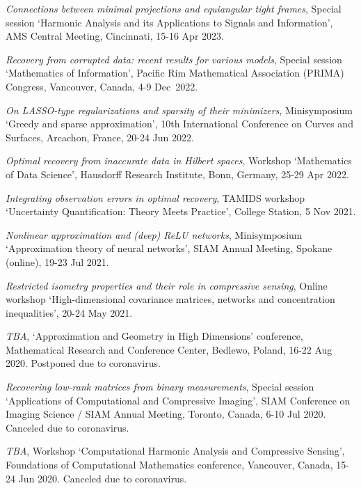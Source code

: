 \documentclass[11pt]{article}
\begin{document}
\item {\sl Connections between minimal projections and equiangular tight frames}, Special session `Harmonic Analysis and its Applications to Signals and Information', AMS Central Meeting,  Cincinnati,  15-16 Apr 2023.
\item {\sl Recovery from corrupted data: recent results for various models},  Special session `Mathematics of Information',
Pacific Rim Mathematical Association (PRIMA) Congress, 
Vancouver, Canada,  4-9 Dec~2022.
\item {\sl On LASSO-type regularizations and sparsity of their minimizers}, Minisymposium `Greedy and sparse approximation',
10th International Conference on Curves and Surfaces,
Arcachon, France, 20-24 Jun 2022.
\item {\sl Optimal recovery from inaccurate data in Hilbert spaces},
Workshop `Mathematics of Data Science',
Hausdorff Research Institute, Bonn, Germany,  25-29 Apr 2022.
\item {\sl Integrating observation errors in optimal recovery},
TAMIDS workshop `Uncertainty Quantification: Theory Meets Practice',
College Station, 5 Nov 2021.
\item {\sl Nonlinear approximation and (deep) ReLU networks}, Minisymposium `Approximation theory of neural networks',
SIAM Annual Meeting, Spokane (online),
19-23 Jul 2021.
\item {\sl Restricted isometry properties and their role in compressive sensing},
Online workshop `High-dimensional covariance matrices, networks and concentration inequalities', 20-24 May 2021.
\item {\sl TBA},
`Approximation and Geometry in High Dimensions' conference,
Mathematical Research and Conference Center, Bedlewo, Poland,
16-22 Aug 2020.
{\small Postponed due to coronavirus.}
\item {\sl Recovering low-rank matrices from binary measurements}, 
Special session
`Applications of Computational and Compressive Imaging',
SIAM Conference on Imaging Science / SIAM Annual Meeting,
Toronto, Canada, 6-10 Jul 2020.
{\small Canceled due to coronavirus.}
\item {\sl TBA},
Workshop `Computational Harmonic Analysis and Compressive Sensing',
Foundations of Computational Mathematics conference, 
Vancouver, Canada, 15-24 Jun 2020. {\small Canceled due to coronavirus.}
\end{document}

